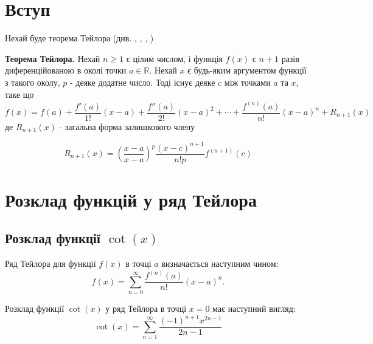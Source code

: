 



	
	\section{Вступ}
	Нехай буде теорема Тейлора (див. \cite{LaTeX-metadata}, \cite{latexguide}, \cite{ozdemir2023quick}, \cite{weisstein} )
	\begin{theorem}\label{ttt1}
		\textbf{Теорема Тейлора.} Нехай $n\geq1$ є цілим числом, і функція $f(x)$ є $n+1$ разів диференційованою в околі точки $a\in\mathbb{R}$. Нехай $x$ є будь-яким аргументом функції з такого околу, $p$ - деяке додатне число. Тоді існує деяке $c$ між точками $a$ та $x$, таке що
		\begin{equation}\label{mvm}
			f(x)=f(a)+\frac{f'(a)}{1!}(x-a)+\frac{f''(a)}{2!}(x-a)^2+\cdots+\frac{f^{(n)}(a)}{n!}(x-a)^n+R_{n+1}(x)
		\end{equation}
		де $R_{n+1}(x)$ - загальна форма залишкового члену
		
		\begin{equation}\label{xcxxxs}
			R_{n+1}(x)=\left(\frac{x-a}{x-a}\right)^p \frac{(x-c)^{n+1}}{n!p}f^{(n+1)}(c)
		\end{equation}

		\end{theorem}
	\section{Розклад функцій у ряд Тейлора}
	
	\subsection{Розклад функції \( \cot(x) \)}
	
	\begin{definition}
		Ряд Тейлора для функції \( f(x) \) в точці \( a \) визначається наступним чином:
		\[
		f(x) = \sum_{n=0}^{\infty} \frac{f^{(n)}(a)}{n!}(x-a)^n.
		\]
	\end{definition}
	
	\begin{theorem}
		Розклад функції \( \cot(x) \) у ряд Тейлора в точці \( x = 0 \) має наступний вигляд:
			\begin{equation} \label{eq:cot_general}
	\cot(x) = \sum_{n=1}^{\infty} \frac{(-1)^{n+1} x^{2n-1}}{2n-1} 
			\end{equation}
	\end{theorem}
	
